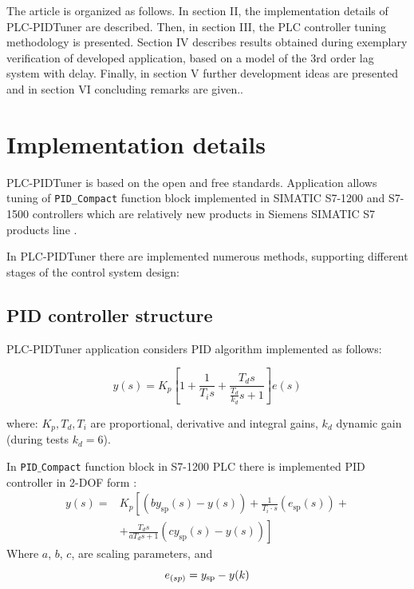 \documentclass{amcs}
\begin{document}
The article is organized as follows. In section II, the implementation details of PLC-PIDTuner are described. Then, in section III, the PLC controller tuning methodology is presented. Section IV describes results obtained during exemplary verification of developed application, based on a model of the 3rd order lag system with delay. Finally, in section V further development ideas are presented and in section VI concluding remarks are given..

\section{Implementation details}
%
PLC-PIDTuner is based on the open and free standards. Application allows tuning of \texttt{PID\_Compact} function block implemented in SIMATIC S7-1200 and S7-1500 controllers which are relatively new products in Siemens SIMATIC S7 products line \cite{Mozaryn:2016}. 

In PLC-PIDTuner there are implemented numerous methods, supporting different stages of the control system design: 
%
\subsection{PID controller structure}

PLC-PIDTuner application considers PID algorithm implemented as follows:

\begin{equation}\label{eq20}
y(s)=K_{p}\left[1+\frac{1}{T_{i}s}+\frac{T_{d}s}{\frac{T_{d}}{k_{d}}s+1}\right]e(s)
\end{equation}

where: $K_{p}, T_{d}, T_{i}$ are proportional, derivative and integral gains, $k_{d}$ dynamic gain (during tests $k_{d}=6$). 

In \texttt{PID$\_$Compact} function block in S7-1200 PLC there is implemented PID controller in 2-DOF form \cite{Siemens:2013}:
%
\begin{equation}\label{eq21}
\begin{array}{ll}
y(s)=&K_{p}\left[(by_{\text{sp}}(s)-y(s))+\frac{1}{T_{i}\cdot s}(e_{\text{sp}}(s))+\right.\\
&\left.+\frac{T_{d}s}{aT_{d}s+1}(cy_{\text{sp}}(s)-y(s))\right]
\end{array}
\end{equation}
Where $a$, $b$, $c$, are scaling parameters, and \begin{equation}
e_{\text(sp)}=y_{\text{sp}}-y(k)
\end{equation}\label{eq23}
\end{document}
